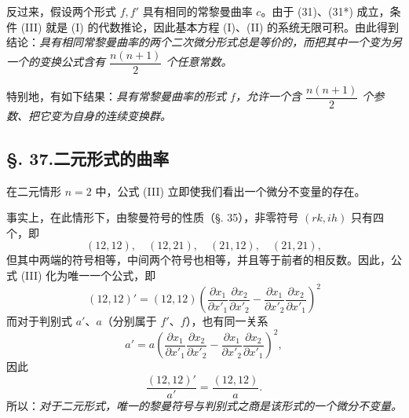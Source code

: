 反过来，假设两个形式 $f,f'$ 具有相同的常黎曼曲率 $c$。由于 (31)、(31*) 成立，条件 (III) 就是 (I) 的代数推论，因此基本方程 (I)、(II) 的系统无限可积。由此得到结论：\emph{具有相同常黎曼曲率的两个二次微分形式总是等价的，而把其中一个变为另一个的变换公式含有 $\dfrac{n(n+1)}{2}$ 个任意常数。}

特别地，有如下结果：\emph{具有常黎曼曲率的形式 $f$，允许一个含 $\dfrac{n(n+1)}{2}$ 个参数、把它变为自身的连续变换群。}

\subsection*{\S. 37.\quad 二元形式的曲率}
在二元情形 $n=2$ 中，公式 (III) 立即使我们看出一个微分不变量的存在。

事实上，在此情形下，由黎曼符号的性质（§. 35），非零符号 $(rk,ih)$ 只有四个，即
\[
(12,12),\quad (12,21),\quad (21,12),\quad (21,21),
\]
但其中两端的符号相等，中间两个符号也相等，并且等于前者的相反数。因此，公式 (III) 化为唯一一个公式，即
\[
(12,12)'=(12,12)\left(\frac{\partial x_1}{\partial x'_1}\frac{\partial x_2}{\partial x'_2}-\frac{\partial x_1}{\partial x'_2}\frac{\partial x_2}{\partial x'_1}\right)^2
\]
而对于判别式 $a'$、$a$（分别属于 $f'$、$f$），也有同一关系
\[
a'=a\left(\frac{\partial x_1}{\partial x'_1}\frac{\partial x_2}{\partial x'_2}-\frac{\partial x_1}{\partial x'_2}\frac{\partial x_2}{\partial x'_1}\right)^2,
\]
因此
\[
\frac{(12,12)'}{a'}=\frac{(12,12)}{a}.
\]
所以：\emph{对于二元形式，唯一的黎曼符号与判别式之商是该形式的一个微分不变量。}

